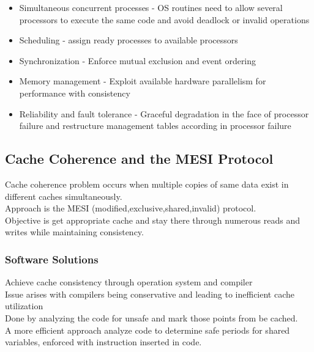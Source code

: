 \documentclass[12pt, a4paper]{article}
\begin{document}
			\begin{itemize}
				\item Simultaneous concurrent processes - OS routines need to allow several processors to execute the same code and avoid deadlock or invalid operations
				\item Scheduling - assign ready processes to available processors
				\item Synchronization - Enforce mutual exclusion and event ordering
				\item Memory management - Exploit available hardware parallelism for performance with consistency
				\item Reliability and fault tolerance - Graceful degradation in the face of processor failure and restructure management tables according in processor failure
			\end{itemize}
		\subsection{Cache Coherence and the MESI Protocol}
			Cache coherence problem occurs when multiple copies of same data exist in different caches simultaneously.\\
			Approach is the MESI (modified,exclusive,shared,invalid) protocol.\\
			Objective is get appropriate cache and stay there through numerous reads and writes while maintaining consistency.\\
			\subsubsection{Software Solutions}
				Achieve cache consistency through operation system and compiler\\
				Issue arises with compilers being conservative and leading to inefficient cache utilization\\
				Done by analyzing the code for unsafe and mark those points from be cached.\\
				A more efficient approach analyze code to determine safe periods for shared variables, enforced with instruction inserted in code.\\
\end{document}
